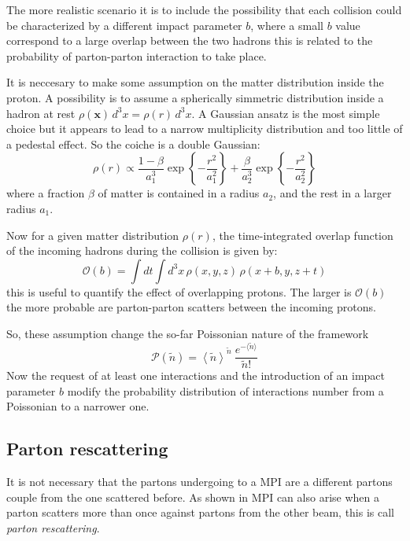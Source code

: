 The more realistic scenario it is to include the possibility that each collision could be characterized by a different impact parameter $b$, where a small $b$ value correspond to a large overlap between the two hadrons this is related to the probability of parton-parton interaction to take place.

It is neccesary to make some assumption on the matter distribution inside the proton. A possibility is to assume a spherically simmetric distribution inside a hadron at rest $\rho(\mathbf{x})\,d^3x=\rho(r)\,d^3x$. A Gaussian ansatz is the most simple choice but it appears to lead to a narrow multiplicity distribution and too little of a pedestal effect. So the coiche is a double Gaussian:
\begin{equation}
	\rho(r) \propto \frac{1-\beta}{a_1^3}\exp\left\{-\frac{r^2}{a_1^2}\right\}+\frac{\beta}{a_2^3}\exp\left\{ -\frac{r^2}{a_2^2} \right\}
\end{equation}
where a fraction $\beta$ of matter is contained in a radius $a_2$, and the rest in a larger radius $a_1$.

\bigskip

Now for a given matter distribution $\rho(r)$,  the time-integrated overlap function of the incoming hadrons during the collision is given by:
\begin{equation}
	\mathcal{O}(b)=\displaystyle\int dt \displaystyle\int d^3x\,\rho(x,y,z)\,\rho(x+b,y,z+t)
\end{equation}
this is useful to quantify the effect of overlapping protons.
The larger is $\mathcal{O}(b)$ the more probable are parton-parton scatters between the incoming protons. 

So, these assumption change the so-far Poissonian nature of the framework
\begin{equation}
\mathcal{P}(\widetilde{n})=
	\left\langle \widetilde{n}\right\rangle ^{\widetilde{n}}\ \frac{e^{-\langle\widetilde{n}\rangle}}{\widetilde{n}!}
\end{equation}
Now the request of at least one interactions and the introduction of an impact parameter $b$ modify the probability distribution of interactions number from a Poissonian to a narrower one.

\subsection{Parton rescattering}

It is not necessary that the partons undergoing to a MPI are a different partons couple from the one scattered before. As shown in  MPI can also arise when a parton scatters more than once against partons from the other beam, this is call \textit{parton rescattering}. 

